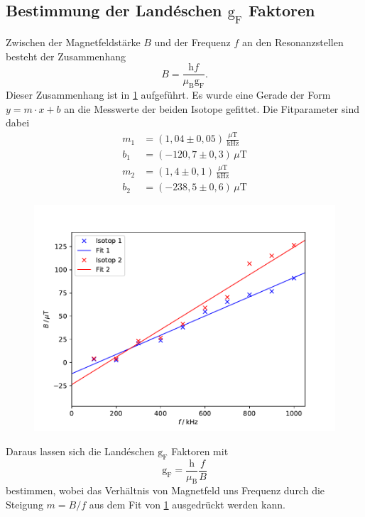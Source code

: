 \subsection{Bestimmung der Landéschen $\text{g}_{\text{F}}$ Faktoren}
Zwischen der Magnetfeldstärke $B$ und der Frequenz $f$ an den Resonanzstellen besteht der Zusammenhang
\begin{equation}
  B=\frac{\text{h}f}{\mu_{\text{B}} \text{g}_{\text{F}}} .
\end{equation}
Dieser Zusammenhang ist in \ref{fig:BFelder} aufgeführt. Es wurde eine Gerade der
Form $y=m\cdot x+b$ an die Messwerte der beiden Isotope gefittet. Die Fitparameter sind dabei
\begin{align*}
  m_1&=(1,04 \pm 0,05)\,\frac{\mu\text{T}}{\text{kHz}} \\
  b_1&=(-120,7 \pm 0,3)\,\mu\text{T}\\
  m_2&=(1,4 \pm 0,1)\,\frac{\mu\text{T}}{\text{kHz}} \\
  b_2&=(-238,5 \pm 0,6)\,\mu\text{T}
\end{align*}
\begin{figure}
  \centering
  \includegraphics{plots/BFelder.pdf}
  \caption{}
  \label{fig:BFelder}
\end{figure}
Daraus lassen sich die Landéschen $\text{g}_{\text{F}}$ Faktoren mit
\begin{equation}
  \text{g}_{\text{F}}=\frac{\text{h}}{\mu_{\text{B}}} \frac{f}{B}
\end{equation}
bestimmen, wobei das Verhältnis von Magnetfeld uns Frequenz durch die
Steigung $m=B/f$ aus dem Fit von \ref{fig:BFelder} ausgedrückt werden kann.\\
